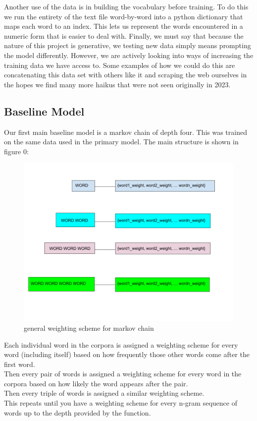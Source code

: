 \documentclass{article} %
\begin{document}
Another use of the data is in building the vocabulary before training.
To do this we run the entirety of the text file word-by-word into a python dictionary that maps each word to an index.
This lets us represent the words encountered in a numeric form that is easier to deal with.
Finally, we must say that because the nature of this project is generative,
we testing new data simply means prompting the model differently.
However, we are actively looking into ways of increasing the training data we have access to.
Some examples of how we could do this are concatenating this data set with others like it
and scraping the web ourselves in the hopes we find many more haikus that were not seen originally in 2023.


\subsection{Baseline Model}

Our first main baseline model is a markov chain of depth four. This was trained on the same data used in the primary model.
The main structure is shown in figure 0:

\begin{figure}[h]
  \begin{center}
  \includegraphics[width=1\textwidth]{Figs/MARKOV.png}
  \end{center}
  \caption{general weighting scheme for markov chain}
  \label{fig:plot}
  \end{figure}

Each individual word in the corpora is assigned a weighting scheme for every word (including itself) based on how frequently those other words come 
after the first word.\\
Then every pair of words is assigned a weighting scheme for every word in the corpora based on how likely the word appears after the pair.\\
Then every triple of words is assigned a similar weighting scheme.\\
This repeats until you have a weighting scheme for every n-gram sequence of words up to the depth provided by the function.\\
\end{document}
